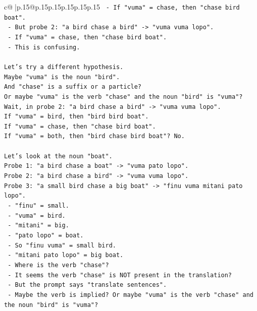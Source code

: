 \documentclass{article}
\begin{document}
{\begin{supertabular}{c@{$\;$}|p{.15\linewidth}@{}p{.15\linewidth}p{.15\linewidth}p{.15\linewidth}p{.15\linewidth}p{.15\linewidth}}
{{{\texttt{          {-} If "vuma" = chase, then "chase bird boat".} \\
\texttt{          {-} But probe 2: "a bird chase a bird" {-}> "vuma vuma lopo".} \\
\texttt{          {-} If "vuma" = chase, then "chase bird boat".} \\
\texttt{          {-} This is confusing.} \\
\\ 
\texttt{Let's try a different hypothesis.} \\
\texttt{Maybe "vuma" is the noun "bird".} \\
\texttt{And "chase" is a suffix or a particle?} \\
\texttt{Or maybe "vuma" is the verb "chase" and the noun "bird" is "vuma"?} \\
\texttt{Wait, in probe 2: "a bird chase a bird" {-}> "vuma vuma lopo".} \\
\texttt{If "vuma" = bird, then "bird bird boat".} \\
\texttt{If "vuma" = chase, then "chase bird boat".} \\
\texttt{If "vuma" = both, then "bird chase bird boat"? No.} \\
\\ 
\texttt{Let's look at the noun "boat".} \\
\texttt{Probe 1: "a bird chase a boat" {-}> "vuma pato lopo".} \\
\texttt{Probe 2: "a bird chase a bird" {-}> "vuma vuma lopo".} \\
\texttt{Probe 3: "a small bird chase a big boat" {-}> "finu vuma mitani pato lopo".} \\
\texttt{  {-} "finu" = small.} \\
\texttt{  {-} "vuma" = bird.} \\
\texttt{  {-} "mitani" = big.} \\
\texttt{  {-} "pato lopo" = boat.} \\
\texttt{  {-} So "finu vuma" = small bird.} \\
\texttt{  {-} "mitani pato lopo" = big boat.} \\
\texttt{  {-} Where is the verb "chase"?} \\
\texttt{  {-} It seems the verb "chase" is NOT present in the translation?} \\
\texttt{  {-} But the prompt says "translate sentences".} \\
\texttt{  {-} Maybe the verb is implied? Or maybe "vuma" is the verb "chase" and the noun "bird" is "vuma"?} \\
}}}
\end{supertabular}}
\end{document}
